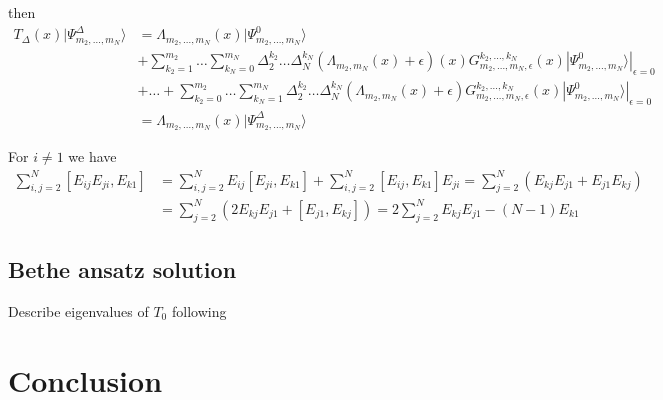 \documentclass[11pt]{article}
\numberwithin{equation}{section}
\numberwithin{equation}{subsection}
\begin{document}
then
\begin{align*}
T_{\Delta}(x)|\Psi_{m_{2},\ldots,m_{N}}^{\Delta}\rangle&=
		\Lambda_{m_{2},\ldots,m_{N}}(x)|\Psi_{m_{2},\ldots,m_{N}}^{0}\rangle
	\\&+
	\sum_{k_{2}=1}^{m_{2}}\ldots\sum_{k_{N}=0}^{m_{N}}\Delta_{2}^{k_{2}}\ldots \Delta_{N}^{k_{N}}\left(\Lambda_{m_{2},m_{N}}(x)+\epsilon\right)(x)G_{m_{2},\ldots,m_{N},\epsilon}^{k_{2},\ldots,k_{N}}(x)|\Psi_{m_{2},\ldots,m_{N}}^{0}\rangle|_{\epsilon=0}
	\\&+\ldots+	\sum_{k_{2}=0}^{m_{2}}\ldots\sum_{k_{N}=1}^{m_{N}}\Delta_{2}^{k_{2}}\ldots \Delta_{N}^{k_{N}}\left(\Lambda_{m_{2},m_{N}}(x)+\epsilon\right)G_{m_{2},\ldots,m_{N},\epsilon}^{k_{2},\ldots,k_{N}}(x)|\Psi_{m_{2},\ldots,m_{N}}^{0}\rangle|_{\epsilon=0}
	\\&=
	\Lambda_{m_{2},\ldots,m_{N}}(x)|\Psi_{m_{2},\ldots,m_{N}}^{\Delta}\rangle
\end{align*}

For $i\neq 1$ we have
\begin{equation}
\begin{split}
 \sum_{i,j=2}^N [E_{ij}E_{ji},E_{k1}]&=\sum_{i,j=2}^N E_{ij} [E_{ji},E_{k1}]+\sum_{i,j=2}^N  [E_{ij},E_{k1}]E_{ji}=\sum_{j=2}^N( E_{kj} E_{j1}+ E_{j1} E_{kj})
\\&=\sum_{j=2}^N( 2E_{kj} E_{j1}+ [E_{j1}, E_{kj}])=2\sum_{j=2}^N E_{kj} E_{j1}-(N-1)E_{k1}
 \end{split}
\end{equation} 

\subsection{Bethe ansatz solution}
Describe eigenvalues of $T_0$ following 
\cite{Belliard2} 
\section{Conclusion}






\end{document}
